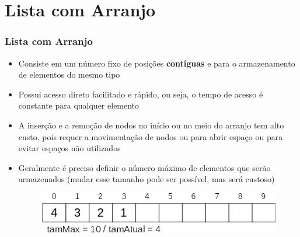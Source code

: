 \documentclass[aspectratio=169]{beamer}
\begin{document}
\section{Lista com Arranjo}

\begin{frame}\frametitle{Lista com Arranjo}
\begin{itemize}
	\item Consiste em um número fixo de posições \textbf{contíguas} e para o armazenamento de elementos do mesmo tipo
	\item Possui acesso direto facilitado e rápido, ou seja, o tempo de acesso é constante para qualquer elemento
	\item A inserção e a remoção de nodos no início ou no meio do arranjo tem alto custo, pois requer a movimentação de nodos ou para abrir espaço ou para evitar espaços não utilizados
	\item Geralmente é preciso definir o número máximo de elementos que serão armazenados (mudar esse tamanho pode ser possível, mas será custoso)
\begin{figure}[h]
	\centering
	\includegraphics[height=0.15\paperheight]{imagens/lista_com_arranjo.png}
\end{figure}
\end{itemize}
\end{frame}
\end{document}
